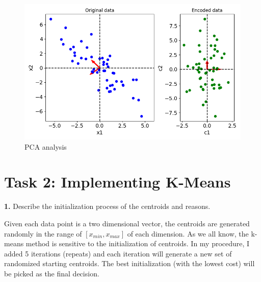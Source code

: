 \begin{figure}[H]
    \centering
    \includegraphics[width=120mm]{task1.png}
    \caption{PCA analysis}
    \label{fig:task1}
\end{figure}


\newpage
\section*{\textbf{Task 2: Implementing K-Means }}




\textbf{1.} Describe the initialization process of the centroids and reasons.

Given each data point is a two dimensional vector, the centroids are generated randomly in the range of $[ x_{min}, x_{max} ] $ of each dimension. As we all know, the k-means method is sensitive to the initialization of centroids. In my procedure, I added 5 iterations (repeats) and each iteration will generate a new set of randomized starting centroids. The best initialization (with the lowest cost) will be picked as the final decision.


